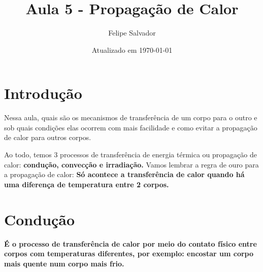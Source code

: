 \documentclass[12pt]{extarticle}
\title{Aula 5  - Propagação de Calor}
\author{Felipe Salvador}
\date{Atualizado em \today}
\newcommand{\<}{\langle}
\renewcommand{\>}{\rangle}
\theoremstyle{definition}
\begin{document}
\maketitle

\section{Introdução}
Nessa aula, quais são os mecanismos de transferência de um corpo para o outro e sob quais condições elas ocorrem com mais facilidade e como evitar a propagação de calor para outros corpos.

Ao todo, temos 3 processos de transferência de energia térmica ou propagação de calor: \textbf{condução, convecção e irradiação.} Vamos lembrar a regra de ouro para a propagação de calor: \textbf{Só acontece a transferência de calor quando há uma diferença de temperatura entre 2 corpos.}

\section{Condução}

\textbf{É o processo de transferência de calor por meio do contato físico entre corpos com temperaturas diferentes, por exemplo: encostar um corpo mais quente num corpo mais frio.}
\end{document}
